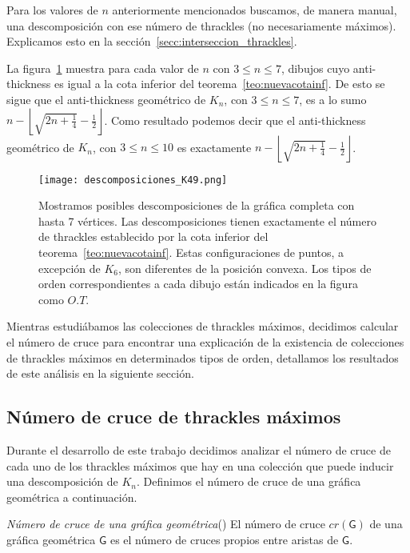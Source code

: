   Para los valores de $n$ anteriormente mencionados buscamos, de manera manual, una descomposición
  con ese número de thrackles (no necesariamente máximos). Explicamos esto en la
  sección~\ref{secc:interseccion_thrackles}.

  La figura~\ref{fig:descomposicionesk4_k9} muestra para cada valor de $n$ con $3\leq n\leq 7$, dibujos
  cuyo anti-thickness  es igual a la cota inferior del teorema~\ref{teo:nuevacotainf}. De esto se sigue
  que el anti-thickness geométrico de $K_n$, con $ 3 \leq n \leq 7$, es a lo
  sumo $n - \left\lfloor\sqrt{2n+\frac{1}{4}} - \frac{1}{2}\right\rfloor$.
  Como resultado podemos decir que el anti-thickness geométrico de $K_n$, con $ 3\leq n \leq 10$
  es exactamente $n - \left\lfloor\sqrt{2n+\frac{1}{4}} - \frac{1}{2}\right\rfloor$.

  \begin{figure}[htpb]
    \centering
    \texttt{[image: descomposiciones\_K49.png]}
    \caption{Mostramos posibles descomposiciones de la gráfica completa con
    hasta 7 vértices. Las descomposiciones tienen exactamente el número de
    thrackles establecido por la cota inferior del
    teorema~\ref{teo:nuevacotainf}. Estas configuraciones de puntos, a excepción de $K_6$, son
    diferentes de la posición convexa. Los tipos de orden correspondientes a cada dibujo están
    indicados en la figura como $O.T.$}
    \label{fig:descomposicionesk4_k9}
  \end{figure}

  Mientras estudiábamos las colecciones de thrackles máximos, decidimos calcular el número
  de cruce para encontrar una explicación de la existencia de colecciones de thrackles
  máximos en determinados tipos de orden, detallamos los resultados de este análisis en la
  siguiente sección.

  \subsection{Número de cruce de thrackles máximos }\label{secc:cnthracklemax}

    Durante el desarrollo de este trabajo decidimos analizar el número de cruce
    de cada uno de los thrackles máximos que hay en una colección que puede inducir una
    descomposición de $K_n$. Definimos el número de cruce de una gráfica geométrica a continuación.

    \begin{definition}{\emph{Número de cruce de una gráfica geométrica}(\cite{Schaefer2018})}
      El número de cruce $cr(\mathsf{G})$ de una gráfica geométrica $\mathsf{G}$
      es el número de cruces propios entre aristas de $\mathsf{G}$.
    \end{definition}

